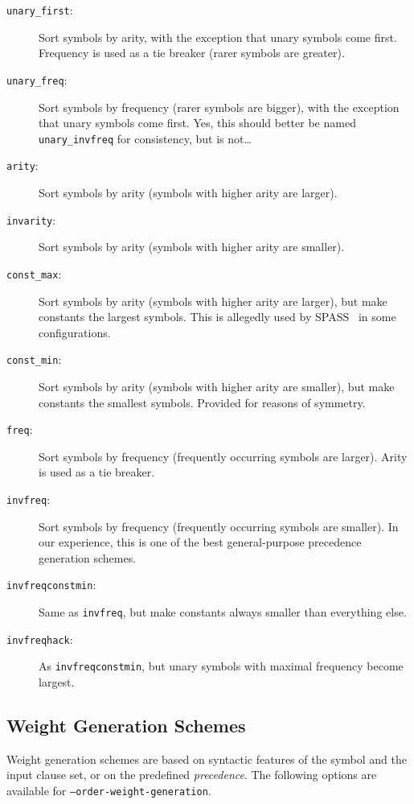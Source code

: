 \documentclass{report}
\begin{document}
\begin{description}
\item[\texttt{unary\_first}:] Sort symbols by arity, with the
  exception that unary symbols come first. Frequency is used as a
  tie breaker (rarer symbols are greater).
\item[\texttt{unary\_freq}:] Sort symbols by frequency (rarer symbols
  are bigger), with the exception that unary symbols come first. Yes,
  this should better be named \texttt{unary\_invfreq} for
  consistency, but is not\ldots
\item[\texttt{arity}:] Sort symbols by arity (symbols with higher
  arity are larger).
\item[\texttt{invarity}:] Sort symbols by arity (symbols with higher
  arity are smaller).
\item[\texttt{const\_max}:] Sort symbols by arity (symbols with higher
  arity are larger), but make constants the largest symbols. This is allegedly
  used by SPASS~\cite{Weidenbach:SPASS-2001} in some configurations.
\item[\texttt{const\_min}:] Sort symbols by arity (symbols with higher
  arity are smaller), but make constants the smallest symbols.
  Provided for reasons of symmetry.
\item[\texttt{freq}:] Sort symbols by frequency (frequently occurring
  symbols are larger). Arity is used as a tie breaker.
\item[\texttt{invfreq}:] Sort symbols by frequency (frequently occurring
  symbols are smaller). In our experience, this is one of the best
  general-purpose precedence generation schemes.
\item[\texttt{invfreqconstmin}:] Same as \texttt{invfreq}, but make
  constants always smaller than everything else.
\item[\texttt{invfreqhack}:] As \texttt{invfreqconstmin}, but unary
  symbols with maximal frequency become largest.
\end{description}


\subsection{Weight Generation Schemes}

Weight generation schemes are based on syntactic features of the
symbol and the input clause set, or on the predefined
\emph{precedence}. The following options are available for
\texttt{--order-weight-generation}.
\end{document}
